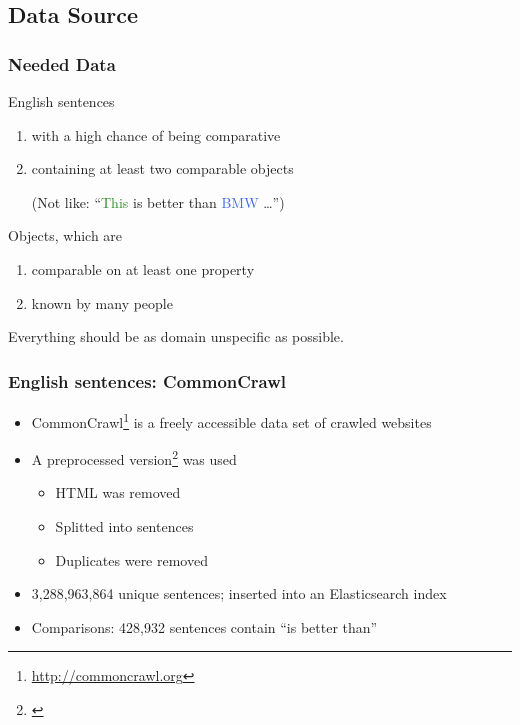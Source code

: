 \documentclass[11pt,aspectratio=169,usenames,dvipsnames]{beamer}
\begin{document}
    \subsection{Data Source}
    \frame{\subsectionpage}

    \begin{frame}[t]
        \frametitle{Needed Data}
        English sentences
                \begin{enumerate}
            \item with a high chance of being comparative
            \item containing at least two comparable objects\\
            \begin{scriptsize}
                (Not like: \enquote{\textcolor{ForestGreen}{This} is better than \textcolor{RoyalBlue}{BMW} \ldots})
            \end{scriptsize}
        \end{enumerate}\pause

        Objects, which are
        \begin{enumerate}
            \item comparable on at least one property
            \item known by many people
        \end{enumerate}\pause
        Everything should be as domain unspecific as possible.
    \end{frame}

    \begin{frame}[t]
        \frametitle{English sentences: CommonCrawl}
        \begin{itemize}
            \item CommonCrawl\footnote{\url{http://commoncrawl.org}} is a freely accessible data set of crawled websites
            \item A preprocessed version\footnote{\cite{Panchenko:2017aa}} was used
            \begin{itemize}
                \item HTML was removed
                \item Splitted into sentences
                \item Duplicates were removed
            \end{itemize}\pause
            \item 3,288,963,864 unique sentences; inserted into an Elasticsearch index
            \item Comparisons: 428,932 sentences contain \enquote{is better than}
        \end{itemize}

    \end{frame}
\end{document}
